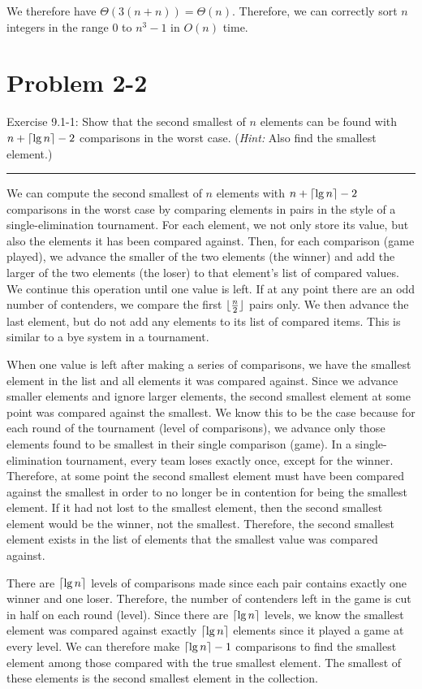 \documentclass[11pt]{article}
\def\separateline{\medskip\hrule\medskip}
\DeclarePairedDelimiter{\ceil}{\lceil}{\rceil}
\DeclarePairedDelimiter\floor{\lfloor}{\rfloor}
\begin{document}
We therefore have $\Theta(3(n + n)) = \Theta(n)$. Therefore, we can correctly sort $n$ integers in the range 0 to $n^3 - 1$ in $O(n)$ time.

\newpage

\section{Problem 2-2}
Exercise 9.1-1: Show that the second smallest of $n$ elements can be found with $n + \ceil{\lg{n}} - 2$ comparisons in the worst case. (\textit{Hint:} Also find the smallest element.)
\separateline

We can compute the second smallest of $n$ elements with $n + \ceil{\lg{n}} - 2$ comparisons in the worst case by comparing elements in pairs in the style of a single-elimination tournament. For each element, we not only store its value, but also the elements it has been compared against. Then, for each comparison (game played), we advance the smaller of the two elements (the winner) and add the larger of the two elements (the loser) to that element's list of compared values. We continue this operation until one value is left. If at any point there are an odd number of contenders, we compare the first $\floor{\frac{n}{2}}$ pairs only. We then advance the last element, but do not add any elements to its list of compared items. This is similar to a bye system in a tournament.

When one value is left after making a series of comparisons, we have the smallest element in the list and all elements it was compared against. Since we advance smaller elements and ignore larger elements, the second smallest element at some point was compared against the smallest. We know this to be the case because for each round of the tournament (level of comparisons), we advance only those elements found to be smallest in their single comparison (game). In a single-elimination tournament, every team loses exactly once, except for the winner. Therefore, at some point the second smallest element must have been compared against the smallest in order to no longer be in contention for being the smallest element. If it had not lost to the smallest element, then the second smallest element would be the winner, not the smallest. Therefore, the second smallest element exists in the list of elements that the smallest value was compared against.

There are $\ceil{\lg{n}}$ levels of comparisons made since each pair contains exactly one winner and one loser. Therefore, the number of contenders left in the game is cut in half on each round (level). Since there are $\ceil{\lg{n}}$ levels, we know the smallest element was compared against exactly $\ceil{\lg{n}}$ elements since it played a game at every level. We can therefore make $\ceil{\lg{n}} - 1$ comparisons to find the smallest element among those compared with the true smallest element. The smallest of these elements is the second smallest element in the collection.
\end{document}
